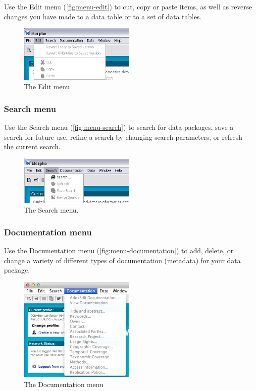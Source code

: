 Use the Edit menu (\autoref{fig:menu-edit}) to cut, copy or paste items,
as well as reverse changes you have made to a data table or to a set of
data tables.

\begin{figure}
  \centering
    \includegraphics[width=0.5\textwidth]{images/menu-edit.jpg}
  \caption{The Edit menu}
  \label{fig:menu-edit}
\end{figure}

\subsubsection{Search menu} \label{sec:menu-search}

Use the Search menu (\autoref{fig:menu-search}) to search for data
packages, save a search for future use, refine a search by changing
search parameters, or refresh the current search. 

\begin{figure}
  \centering
    \includegraphics[width=0.5\textwidth]{images/menu-search.jpg}
  \caption{The Search menu.}
  \label{fig:menu-search}
\end{figure}

\subsubsection{Documentation menu} \label{sec:menu-documentation}

Use the Documentation menu (\autoref{fig:menu-documentation}) to add,
delete, or change a variety of different types of documentation
(metadata) for your data package. 

\begin{figure}
  \centering
    \includegraphics[width=0.5\textwidth]{images/menu-documentation.jpg}
  \caption{The Documentation menu}
  \label{fig:menu-documentation}
\end{figure}

